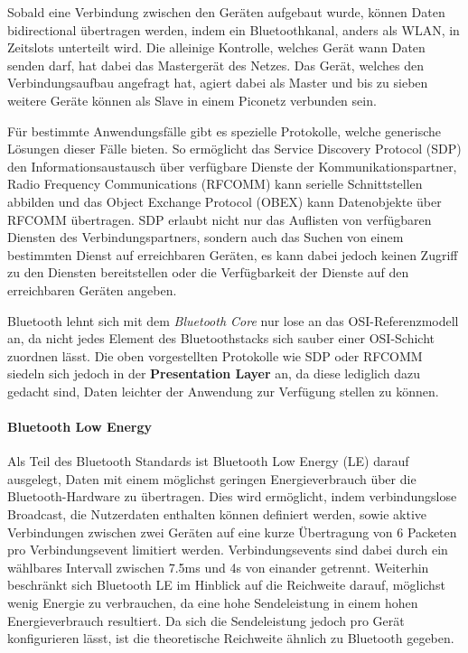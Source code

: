         Sobald eine Verbindung zwischen den Geräten aufgebaut wurde, können Daten bidirectional übertragen werden, indem ein Bluetoothkanal, anders als WLAN, in Zeitslots unterteilt wird.
        Die alleinige Kontrolle, welches Gerät wann Daten senden darf, hat dabei das Mastergerät des Netzes. Das Gerät, welches den Verbindungsaufbau angefragt hat,
        agiert dabei als Master und bis zu sieben weitere Geräte können als Slave in einem Piconetz verbunden sein.\cite[S.379f.]{Sauter}

        Für bestimmte Anwendungsfälle gibt es spezielle Protokolle, welche generische Lösungen dieser Fälle bieten.
        So ermöglicht das Service Discovery Protocol (SDP) den Informationsaustausch über verfügbare Dienste der Kommunikationspartner,
        Radio Frequency Communications (RFCOMM) kann serielle Schnittstellen abbilden und das Object Exchange Protocol (OBEX) kann Datenobjekte über RFCOMM übertragen.\cite[S.229]{Lueders}
        SDP erlaubt nicht nur das Auflisten von verfügbaren Diensten des Verbindungspartners, sondern auch das Suchen von einem bestimmten Dienst auf erreichbaren Geräten,
        es kann dabei jedoch keinen Zugriff zu den Diensten bereitstellen oder die Verfügbarkeit der Dienste auf den erreichbaren Geräten angeben.\cite[S.395f]{Morrow}

        Bluetooth lehnt sich mit dem {\it Bluetooth Core} nur lose an das OSI-Referenzmodell an, da nicht jedes Element des Bluetoothstacks sich sauber einer OSI-Schicht zuordnen lässt.
        Die oben vorgestellten Protokolle wie SDP oder RFCOMM siedeln sich jedoch in der {\bf Presentation Layer} an, da diese lediglich dazu gedacht sind,
        Daten leichter der Anwendung zur Verfügung stellen zu können.\cite[S.382]{Sauter}

        \paragraph{Bluetooth Low Energy}
        Als Teil des Bluetooth Standards ist Bluetooth Low Energy (LE) darauf ausgelegt, Daten mit einem möglichst geringen Energieverbrauch über die Bluetooth-Hardware zu übertragen.
        Dies wird ermöglicht, indem verbindungslose Broadcast, die Nutzerdaten enthalten können definiert werden, sowie aktive Verbindungen zwischen zwei Geräten auf eine kurze Übertragung von 6 Packeten pro Verbindungsevent limitiert werden. Verbindungsevents sind dabei durch ein wählbares Intervall zwischen 7.5ms und 4s von einander getrennt. Weiterhin beschränkt sich Bluetooth LE im Hinblick auf die Reichweite darauf, möglichst wenig Energie zu verbrauchen, da eine hohe Sendeleistung in einem hohen Energieverbrauch resultiert. Da sich die Sendeleistung jedoch pro Gerät konfigurieren lässt, ist die theoretische Reichweite ähnlich zu Bluetooth gegeben.\cite[S.7f.]{Townsend}

